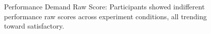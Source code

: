\begin{figure}[h]
\begin{minipage}[t]{0.45\textwidth}
        \captionsetup{width=\textwidth, justification=justified} %
        \caption{Performance Demand Raw Score: Participants showed indifferent performance raw scores across experiment conditions, all trending toward satisfactory.}
        \label{fig:performance_cog_score}
    \end{minipage}
\end{figure}








